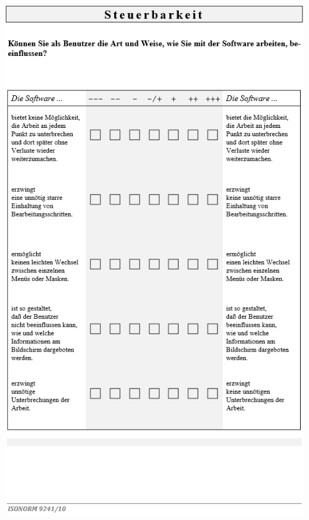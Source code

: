 \bigskip\noindent
\begin{minipage}{\textwidth}
  \centering
  \includegraphics{img/ISO9241-10Fragebogen_S3.PNG}
\end{minipage}

